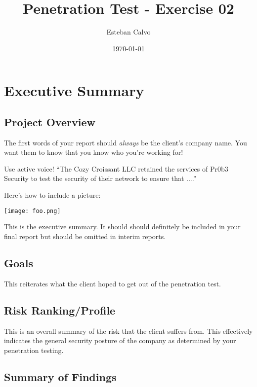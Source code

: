 \documentclass[notitlepage]{article}
\begin{document}
  
\title{Penetration Test - Exercise 02}
\author{Esteban Calvo}
\date{\isodate\today}

\maketitle

\tableofcontents

\newpage
\section{Executive Summary}



\subsection{Project Overview}
The first words of your report should \emph{always} be the client's company name.
You want them to know that you know who you're working for!

Use active voice!
``The Cozy Croissant LLC retained the services of Pr0b3 Security to test the security of their network to ensure that ....''

Here's how to include a picture:

\texttt{[image: foo.png]}

This is the executive summary.
It should should definitely be included in your final report but should be omitted in interim reports.


\subsection{Goals}

This reiterates what the client hoped to get out of the penetration
test.

\subsection{Risk Ranking/Profile}

This is an overall summary of the risk that the client suffers from. This effectively indicates the general security posture of the company as determined by your penetration testing.

\subsection{Summary of Findings}
\end{document}

